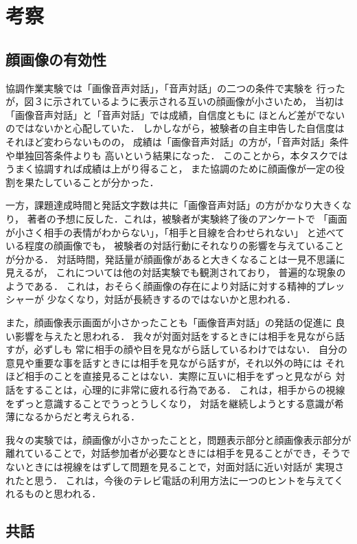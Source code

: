 \section{考察}

\subsection{顔画像の有効性}

協調作業実験では「画像音声対話」，「音声対話」の二つの条件で実験を
行ったが，図３に示されているように表示される互いの顔画像が小さいため，
当初は「画像音声対話」と「音声対話」では成績，自信度ともに
ほとんど差がでないのではないかと心配していた．
しかしながら，被験者の自主申告した自信度はそれほど変わらないものの，
成績は「画像音声対話」の方が，「音声対話」条件や単独回答条件よりも
高いという結果になった．
このことから，本タスクではうまく協調すれば成績は上がり得ること，
また協調のために顔画像が一定の役割を果たしていることが分かった．

一方，課題達成時間と発話文字数は共に「画像音声対話」の方がかなり大きくなり，
著者の予想に反した．これは，被験者が実験終了後のアンケートで
「画面が小さく相手の表情がわからない」，「相手と目線を合わせられない」
と述べている程度の顔画像でも，
被験者の対話行動にそれなりの影響を与えていることが分かる．
対話時間，発話量が顔画像があると大きくなることは一見不思議に見えるが，
これについては他の対話実験でも観測されており，
普遍的な現象のようである\cite{Young1994}．
これは，おそらく顔画像の存在により対話に対する精神的プレッシャーが
少なくなり，対話が長続きするのではないかと思われる．

また，顔画像表示画面が小さかったことも「画像音声対話」の発話の促進に
良い影響を与えたと思われる．
我々が対面対話をするときには相手を見ながら話すが，必ずしも
常に相手の顔や目を見ながら話しているわけではない．
自分の意見や重要な事を話すときには相手を見ながら話すが，それ以外の時には
それほど相手のことを直接見ることはない．実際に互いに相手をずっと見ながら
対話をすることは，心理的に非常に疲れる行為である．
これは，相手からの視線をずっと意識することでうっとうしくなり，
対話を継続しようとする意識が希薄になるからだと考えられる．

我々の実験では，顔画像が小さかったことと，問題表示部分と顔画像表示部分が
離れていることで，対話参加者が必要なときには相手を見ることができ，そうで
ないときには視線をはずして問題を見ることで，対面対話に近い対話が
実現されたと思う．
これは，今後のテレビ電話の利用方法に一つのヒントを与えてくれるものと思われる．

\subsection{共話}

